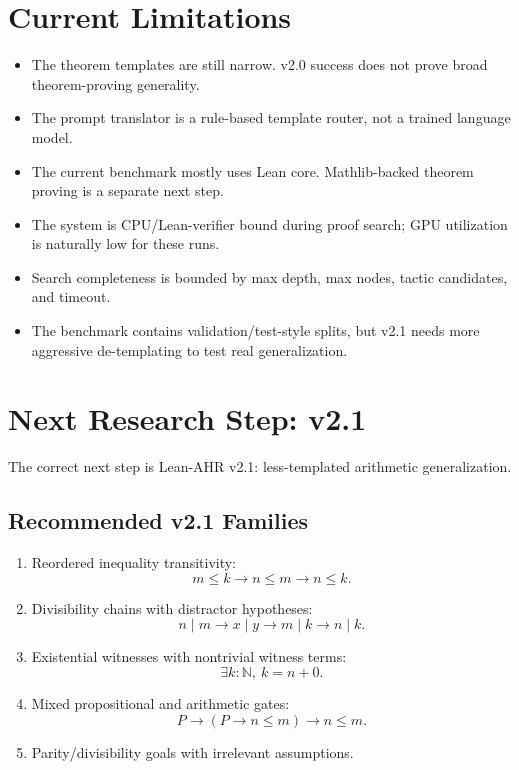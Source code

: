 \documentclass[11pt]{article}
\begin{document}
\section{Current Limitations}

\begin{itemize}
  \item The theorem templates are still narrow. v2.0 success does not prove broad theorem-proving generality.
  \item The prompt translator is a rule-based template router, not a trained language model.
  \item The current benchmark mostly uses Lean core. Mathlib-backed theorem proving is a separate next step.
  \item The system is CPU/Lean-verifier bound during proof search; GPU utilization is naturally low for these runs.
  \item Search completeness is bounded by max depth, max nodes, tactic candidates, and timeout.
  \item The benchmark contains validation/test-style splits, but v2.1 needs more aggressive de-templating to test real generalization.
\end{itemize}

\section{Next Research Step: v2.1}

The correct next step is Lean-AHR v2.1: less-templated arithmetic generalization.

\subsection{Recommended v2.1 Families}

\begin{enumerate}
  \item Reordered inequality transitivity:
  \[
  m \le k \rightarrow n \le m \rightarrow n \le k.
  \]
  \item Divisibility chains with distractor hypotheses:
  \[
  n \mid m \rightarrow x \mid y \rightarrow m \mid k \rightarrow n \mid k.
  \]
  \item Existential witnesses with nontrivial witness terms:
  \[
  \exists k : \mathbb{N},\ k = n + 0.
  \]
  \item Mixed propositional and arithmetic gates:
  \[
  P \rightarrow (P \rightarrow n \le m) \rightarrow n \le m.
  \]
  \item Parity/divisibility goals with irrelevant assumptions.
\end{enumerate}
\end{document}
